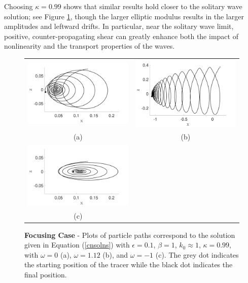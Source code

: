 \documentclass{JFM_Style/jfm}
\begin{document}
Choosing $\kappa=0.99$ shows that similar results hold closer to the solitary wave solution; see Figure \ref{fig:foc_kap_pt99}, though the larger elliptic modulus results in the larger amplitudes and leftward drifts.  In particular, near the solitary wave limit, positive, counter-propagating shear can greatly enhance both the impact of nonlinearity and the transport properties of the waves.    
\begin{figure}
\centering
\begin{tabular}{cc}
\includegraphics[width=.48\textwidth]{track_ep_pt1_tf_1_w_0_kap_pt99_foc} & \includegraphics[width=.48\textwidth]{track_ep_pt1_tf_1_w_1pt12_kap_pt99_foc} \\
(a) & (b) \\ 
\includegraphics[width=.48\textwidth]{track_ep_pt1_tf_1_w_n1_kap_pt99_foc} & \\
(c) & 
\end{tabular}
\caption{\small {\bf Focusing Case} - Plots of particle paths correspond to the solution given in Equation (\ref{cnsolns}) with $\epsilon=0.1$, $\beta=1$, $k_{0}\approx 1$, $\kappa=0.99$, with $\omega=0$ (a), $\omega=1.12$ (b), and $\omega=-1$ (c). The grey dot indicates the starting position of the tracer while the black dot indicates the final position.}
\label{fig:foc_kap_pt99}
\end{figure}
\end{document}

